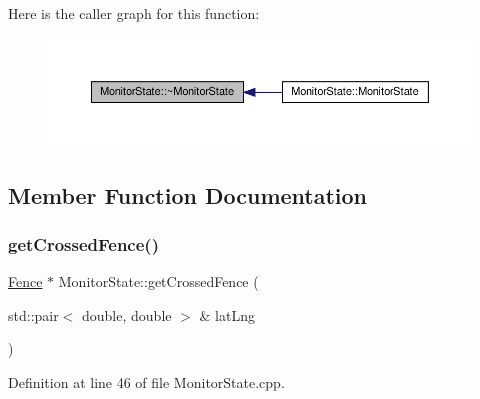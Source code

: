 Here is the caller graph for this function\+:
\nopagebreak
\begin{figure}[H]
\begin{center}
\leavevmode
\includegraphics[width=350pt]{dd/d45/class_monitor_state_a8dc9d7a46aa3d0190ec65b0d56167d3e_icgraph}
\end{center}
\end{figure}


\subsection{Member Function Documentation}
\mbox{\label{class_monitor_state_a332c5f42bf46cd217e36f300e5279766}} 
\subsubsection{\texorpdfstring{get\+Crossed\+Fence()}{getCrossedFence()}}
{\footnotesize\ttfamily \hyperlink{class_fence}{Fence} $\ast$ Monitor\+State\+::get\+Crossed\+Fence (\begin{DoxyParamCaption}\item[{std\+::pair$<$ double, double $>$ \&}]{lat\+Lng }\end{DoxyParamCaption})\hspace{0.3cm}{\ttfamily [protected]}}



Definition at line 46 of file Monitor\+State.\+cpp.


